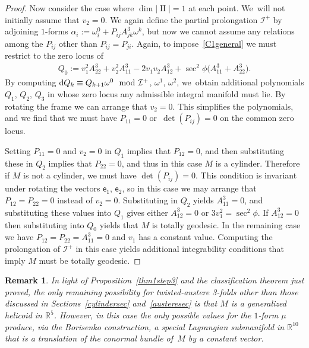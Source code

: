 \documentclass[pdftex]{sigma}
\def\R{\mathbb{R}}
\def\ve{\mathsf{e}}
\def\II{\operatorname{II}} %
\def\I{\mathcal{I}}
\def\w{\omega}
\newtheorem{Remark}[Theorem]{Remark}}
\numberwithin{equation}{section}
\begin{document}
\begin{proof}
Now consider the case where $\dim |\II|=1$ at each point. We~will not initially assume that $v_2=0$. We again define the partial prolongation $\I^+$ by adjoining $1$-forms $\alpha_i := \w^0_i + P_{ij} A^3_{jk} \w^k$, but now we cannot assume any relations among the $P_{ij}$ other than $P_{ij}=P_{ji}$. Again, to impose~\eqref{C1general} we must restrict to the zero locus of
\begin{gather*}
Q_0:=v_1^2 A^3_{22} + v_2^2 A^3_{11} - 2 v_1 v_2 A^3_{12} + \sec^2\phi \big(A^3_{11} + A^3_{22}\big).
\end{gather*}
By computing ${\rm d} Q_k \equiv Q_{k+1} \w^0 \mod \I^+$, $\w^1$, $\w^2$, we~obtain additional polynomials $Q_1$, $Q_2$, $Q_3$ in whose zero locus any admissible integral manifold must lie. By rotating the frame we can arrange that $v_2=0$. This simplifies the polynomials, and we find that we must have $P_{11}=0$ or~$\det(P_{ij})=0$ on the common zero locus.

Setting $P_{11}=0$ and $v_2=0$ in $Q_1$ implies that $P_{12}=0$, and then substituting these in $Q_2$ implies that $P_{22}=0$, and thus in this case $M$ is a cylinder. Therefore if $M$ is not a cylinder, we must have $\det(P_{ij})=0$. This condition is invariant under rotating the vectors $\ve_1$, $\ve_2$, so in this case we may arrange that $P_{12}=P_{22}=0$ instead of $v_2=0$. Substituting in $Q_2$ yields $A^3_{11}=0$, and substituting these values into $Q_1$ gives either $A^3_{12}=0$ or $3 v_1^2=\sec^2\phi$. If $A^3_{12}=0$ then substituting into $Q_0$ yields that $M$ is totally geodesic. In the remaining case we have $P_{12}=P_{22}=A^3_{11}=0$ and $v_1$ has a constant value. Computing the prolongation of $\I^+$ in this case yields additional integrability conditions that imply $M$ must be totally geodesic.
\end{proof}

\begin{Remark}
In light of Proposition~\ref{thm1step3} and the classification theorem just proved, the only remaining possibility for twisted-austere 3-folds other than those discussed in Sections~\ref{cylindersec} and~\ref{austeresec} is that $M$ is a generalized helicoid in $\R^5$. However, in this case the only possible values for the $1$-form $\mu$ produce, via the Borisenko construction, a special Lagrangian submanifold in $\R^{10}$ that is a translation of the conormal bundle of~$M$ by a constant vector.
\end{Remark}

\appendix
\end{document}
